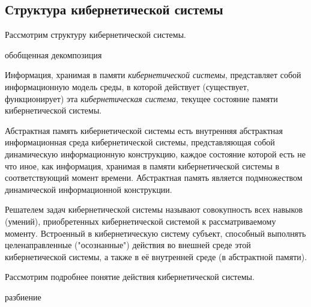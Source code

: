 \subsection{Структура кибернетической системы}
{\label{sec_cyb_syst_structure}} 

Рассмотрим структуру кибернетической системы.
\begin{SCn}
	\begin{scnrelfromset}{обобщенная декомпозиция}
	\end{scnrelfromset}
\end{SCn}

Информация, хранимая в памяти \textit{кибернетической системы}, представляет собой информационную модель среды, в которой действует (существует, функционирует) эта \textit{кибернетическая система}, текущее состояние памяти кибернетической системы.

Абстрактная память кибернетической системы есть внутренняя абстрактная информационная среда кибернетической системы, представляющая собой динамическую информационную  конструкцию, каждое состояние которой есть не что иное, как информация, хранимая в памяти кибернетической системы в соответствующий момент времени. Абстрактная память является подмножеством динамической информационной конструкции.

Решателем задач кибернетической системы называют совокупность всех навыков (умений), приобретенных кибернетической системой к рассматриваемому моменту. Встроенный в кибернетическую систему субъект, способный выполнять целенаправленные ("осознанные") действия во внешней среде этой кибернетической системы, а также в её внутренней среде (в абстрактной памяти).


Рассмотрим подробнее понятие действия кибернетической системы.

\begin{SCn}
\begin{scnrelfromset}{разбиение}
	\begin{scnindent}
	\end{scnindent}

\end{scnrelfromset}
\end{SCn}

